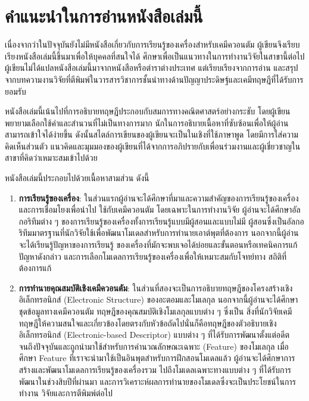 

{

\chapter*{\centering คำแนะนำในการอ่านหนังสือเล่มนี้}

เนื่องจากว่าในปัจจุบันยังไม่มีหนังสือเกี่ยวกับการเรียนรู้ของเครื่องสำหรับเคมีควอนตัม ผู้เขียนจึงเรียบเรียงหนังสือเล่มนี้ขึ้นมาเพื่อให้บุคคลที่สนใจได้%
ศึกษาเพื่อเป็นแนวทางในการทำงานวิจัยในสาขานี้ต่อไป ผู้เขียนไม่ได้แปลหนังสือเล่มนี้มาจากหนังสือหรือตำราต่างประเทศ แต่เรียบเรียงจากการอ่าน%
และสรุปจากบทความงานวิจัยที่ตีพิมพ์ในวารสารวิชาการชั้นนำทางด้านปัญญาประดิษฐ์และเคมีทฤษฎีที่ได้รับการยอมรับ

หนังสือเล่มนี้เน้นไปที่การอธิบายทฤษฏีประกอบกับสมการทางคณิตศาสตร์อย่างกระชับ โดยผู้เขียนพยายามเลือกใช้คำและสำนวนที่ไม่เป็นทางการมาก%
นักในการอธิบายเนื้อหาที่ซับซ้อนเพื่อให้ผู้อ่านสามารถเข้าใจได้ง่ายขึ้น ดังนั้นสไตล์การเขียนของผู้เขียนจะเป็นในเชิงที่ใช้ภาษาพูด โดยมีการใส่ความ%
คิดเห็นส่วนตัว แนวคิดและมุมมองของผู้เขียนที่ได้จากการอภิปรายกับเพื่อนร่วมงานและผู้เชี่ยวชาญในสาขาที่คิดว่าเหมาะสมเข้าไปด้วย

หนังสือเล่มนี้ประกอบไปด้วยเนื้อหาสามส่วน ดังนี้ 
%
\begin{enumerate}[topsep=0pt]
    \item \textbf{การเรียนรู้ของเครื่อง}: ในส่วนแรกผู้อ่านจะได้ศึกษาที่มาและความสำคัญของการเรียนรู้ของเครื่องและการเชื่อมโยงเพื่อนำไป%
    ใช้กับเคมีควอนตัม โดยเฉพาะในการทำงานวิจัย ผู้อ่านจะได้ศึกษาอัลกอริทึมต่าง ๆ ของการเรียนรู้ของเครื่องทั้งการเรียนรู้แบบมีผู้สอนและแบบไม่มี%
    ผู้สอนซึ่งเป็นอัลกอริทึมมาตรฐานที่นักวิจัยใช้เพื่อพัฒนาโมเดลสำหรับการทำนายเอาต์พุตที่ต้องการ นอกจากนี้ผู้อ่านจะได้เรียนรู้ปัญหาของการเรียนรู้%
    ของเครื่องที่มักจะพบเจอได้บ่อยและขั้นตอนหรือเทคนิคการแก้ปัญหาดังกล่าว และการเลือกโมเดลการเรียนรู้ของเครื่องเพื่อให้เหมาะสมกับโจทย์ทาง%
    สถิติที่ต้องการแก้
    
    \item \textbf{การทำนายคุณสมบัติเชิงเคมีควอนตัม}: ในส่วนที่สองจะเป็นการอธิบายทฤษฎีของโครงสร้างเชิงอิเล็กทรอนิกส์ (Electronic 
    Structure) ของอะตอมและโมเลกุล นอกจากนี้ผู้อ่านจะได้ศึกษาชุดข้อมูลทางเคมีควอนตัม ทฤษฎีของคุณสมบัติเชิงโมเลกุลแบบต่าง ๆ ซึ่งเป็น%
    สิ่งที่นักวิจัยเคมีทฤษฎีให้ความสนใจและเกี่ยวข้องโดยตรงกับหัวข้อถัดไปนั่นก็คือทฤษฎีของตัวอธิบายเชิงอิเล็กทรอนิกส์ (Electronic-based 
    Descriptor) แบบต่าง ๆ ที่ได้รับการพัฒนาตั้งแต่อดีตจนถึงปัจจุบันและถูกนำมาใช้สำหรับการคำนวณลักษณะเฉพาะ (Feature) ของโมเลกุล 
    เมื่อศึกษา Feature ที่เราจะนำมาใช้เป็นอินพุตสำหรับการฝึกสอนโมเดลแล้ว ผู้อ่านจะได้ศึกษาการสร้างและพัฒนาโมเดลการเรียนรู้ของเครื่องรวม%
    ไปถึงโมเดลเฉพาะทางแบบต่าง ๆ ที่ได้รับการพัฒนาในช่วงสิบปีที่ผ่านมา และการวิเคราะห์ผลการทำนายของโมเดลซึ่งจะเป็นประโยชน์ในการทำงาน%
    วิจัยและการตีพิมพ์ต่อไป


\end{enumerate}}
